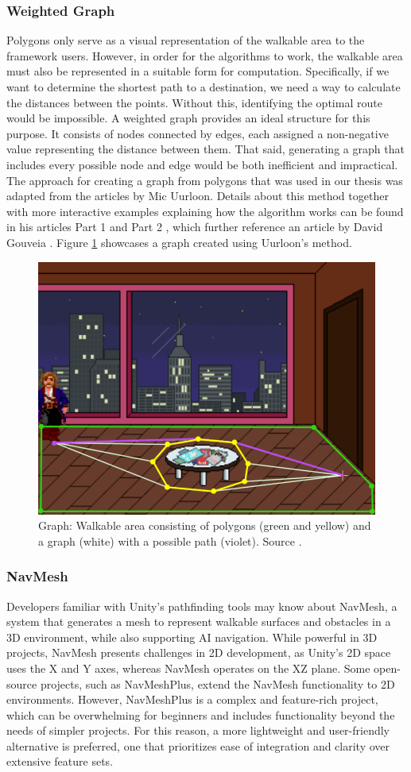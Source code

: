 \subsubsection{Weighted Graph}
\label{Analysis:Graph}
Polygons only serve as a visual representation of the walkable area to the framework users. However, in order for the algorithms to work, the walkable area must also be represented in a suitable form for computation. Specifically, if we want to determine the shortest path to a destination, we need a way to calculate the distances between the points. Without this, identifying the optimal route would be impossible. A weighted graph provides an ideal structure for this purpose. It consists of nodes connected by edges, each assigned a non-negative value representing the distance between them. That said, generating a graph that includes every possible node and edge would be both inefficient and impractical. The approach for creating a graph from polygons that was used in our thesis was adapted from the articles by Mic Uurloon. Details about this method together with more interactive examples explaining how the algorithm works can be found in his articles Part 1 \cite{Uurloon1} and Part 2 \cite{Uurloon2}, which further reference an article by David Gouveia \cite{Gouveia}.
Figure \ref{fig:Graph}
showcases a graph created using Uurloon's method.
\begin{figure}[H]
\centering
\includegraphics[width=.6\linewidth]{img/WS-polygons3.png}
\caption{Graph: Walkable area consisting of polygons (green and yellow) and a graph (white) with a possible path (violet). Source \cite{Uurloon1}.}
\label{fig:Graph}
\end{figure}

\subsubsection{NavMesh}
Developers familiar with Unity’s pathfinding tools may know about NavMesh, a system that generates a mesh to represent walkable surfaces and obstacles in a 3D environment, while also supporting AI navigation. While powerful in 3D projects, NavMesh presents challenges in 2D development, as Unity's 2D space uses the X and Y axes, whereas NavMesh operates on the XZ plane. Some open-source projects, such as NavMeshPlus, extend the NavMesh functionality to 2D environments. However, NavMeshPlus is a complex and feature-rich project, which can be overwhelming for beginners and includes functionality beyond the needs of simpler projects. For this reason, a more lightweight and user-friendly alternative is preferred, one that prioritizes ease of integration and clarity over extensive feature sets. 

